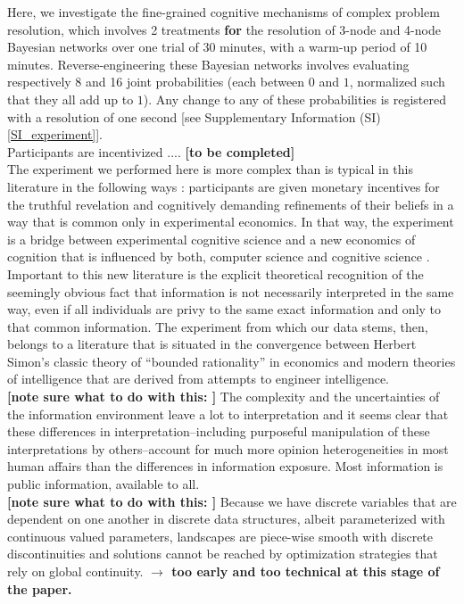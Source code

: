 Here, we investigate the fine-grained cognitive mechanisms of complex problem resolution, which involves 2 treatments {\bf for} the resolution of 3-node and 4-node Bayesian networks over one trial of 30 minutes, with a warm-up period of 10 minutes. Reverse-engineering these Bayesian networks involves evaluating respectively 8 and 16 joint probabilities (each between $0$ and $1$, normalized such that they all add up to $1$). Any change to any of these probabilities is registered with a resolution of one second [see Supplementary Information (SI) \ref{SI_experiment}].\\

Participants are incentivized .... {\bf [to be completed]}\\

The experiment we performed here is more complex than is typical in this literature in the following ways : participants are given monetary incentives for the truthful revelation and cognitively demanding refinements of their beliefs in a way that is common only in experimental economics.  In that way, the experiment is a bridge between experimental cognitive science and a new economics of cognition that is influenced by both, computer science and cognitive science \cite{Spiegler2016}. Important to this new literature is the explicit theoretical recognition of the seemingly obvious fact that information is not necessarily interpreted in the same way, even if all individuals are privy to the same exact information and only to that common information. The experiment from which our data stems, then, belongs to a literature that is situated in the convergence between Herbert Simon's classic theory of ``bounded rationality'' in economics \cite{Gigerenzer2001, Rubinstein98, tsang2008computational, simon1955behavioral} and modern theories of intelligence that are derived from attempts to engineer intelligence.\\  

{\bf [note sure what to do with this: ]} The complexity and the uncertainties of the information environment leave a lot to interpretation and it seems clear that these differences in interpretation--including purposeful manipulation of these interpretations by others--account for much more opinion heterogeneities in most human affairs than the differences in information exposure.  Most information is public information, available to all.\\

{\bf [note sure what to do with this: ]} Because we have discrete variables that are dependent on one another in discrete data structures, albeit parameterized with continuous valued parameters, landscapes are piece-wise smooth with discrete discontinuities and solutions cannot be reached by optimization strategies that rely on global continuity. {\bf $\rightarrow$ too early and too technical at this stage of the paper.} \\

